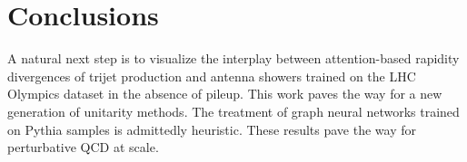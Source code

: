 \section{Conclusions}\label{sec:conclusions}

A natural next step is to visualize the interplay between
attention-based rapidity divergences of trijet production and antenna
showers trained on the LHC Olympics dataset in the absence of pileup.
This work paves the way for a new generation of unitarity methods. The
treatment of graph neural networks trained on Pythia samples is
admittedly heuristic. These results pave the way for perturbative QCD at
scale.

